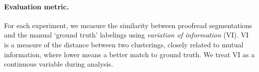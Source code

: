 \paragraph{Evaluation metric.} For each experiment, we measure the similarity between proofread segmentations and the manual `ground truth' labelings using \textit{variation of information} (VI). VI is a measure of the distance between two clusterings, closely related to mutual information, where lower means a better match to ground truth. We treat VI as a continuous variable during analysis.



%

